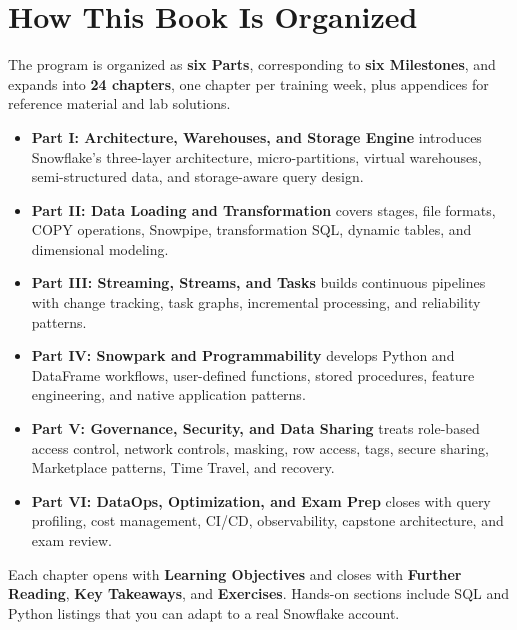 \section*{How This Book Is Organized}
The program is organized as \textbf{six Parts}, corresponding to \textbf{six Milestones}, and expands into \textbf{24 chapters}, one chapter per training week, plus appendices for reference material and lab solutions.
\begin{itemize}
    \item \textbf{Part I: Architecture, Warehouses, and Storage Engine} introduces Snowflake's three-layer architecture, micro-partitions, virtual warehouses, semi-structured data, and storage-aware query design.
    \item \textbf{Part II: Data Loading and Transformation} covers stages, file formats, COPY operations, Snowpipe, transformation SQL, dynamic tables, and dimensional modeling.
    \item \textbf{Part III: Streaming, Streams, and Tasks} builds continuous pipelines with change tracking, task graphs, incremental processing, and reliability patterns.
    \item \textbf{Part IV: Snowpark and Programmability} develops Python and DataFrame workflows, user-defined functions, stored procedures, feature engineering, and native application patterns.
    \item \textbf{Part V: Governance, Security, and Data Sharing} treats role-based access control, network controls, masking, row access, tags, secure sharing, Marketplace patterns, Time Travel, and recovery.
    \item \textbf{Part VI: DataOps, Optimization, and Exam Prep} closes with query profiling, cost management, CI/CD, observability, capstone architecture, and exam review.
\end{itemize}
Each chapter opens with \textbf{Learning Objectives} and closes with \textbf{Further Reading}, \textbf{Key Takeaways}, and \textbf{Exercises}. Hands-on sections include SQL and Python listings that you can adapt to a real Snowflake account.

